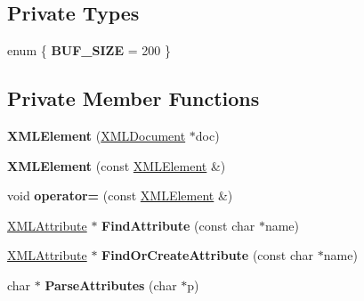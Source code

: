 \subsection*{Private Types}
\begin{DoxyCompactItemize}
\item 
enum \{ {\bfseries B\+U\+F\+\_\+\+S\+I\+ZE} = 200
 \}\hypertarget{classtinyxml2_1_1_x_m_l_element_a7b020049b954a66ca9d2ba91afe62319}{}\label{classtinyxml2_1_1_x_m_l_element_a7b020049b954a66ca9d2ba91afe62319}

\end{DoxyCompactItemize}
\subsection*{Private Member Functions}
\begin{DoxyCompactItemize}
\item 
{\bfseries X\+M\+L\+Element} (\hyperlink{classtinyxml2_1_1_x_m_l_document}{X\+M\+L\+Document} $\ast$doc)\hypertarget{classtinyxml2_1_1_x_m_l_element_a52484940e20f3734e6edc5e5c3af2dbc}{}\label{classtinyxml2_1_1_x_m_l_element_a52484940e20f3734e6edc5e5c3af2dbc}

\item 
{\bfseries X\+M\+L\+Element} (const \hyperlink{classtinyxml2_1_1_x_m_l_element}{X\+M\+L\+Element} \&)\hypertarget{classtinyxml2_1_1_x_m_l_element_a1aa8ab977a1799bf118efb158248351b}{}\label{classtinyxml2_1_1_x_m_l_element_a1aa8ab977a1799bf118efb158248351b}

\item 
void {\bfseries operator=} (const \hyperlink{classtinyxml2_1_1_x_m_l_element}{X\+M\+L\+Element} \&)\hypertarget{classtinyxml2_1_1_x_m_l_element_ae300366701a54d4b6d1c287d9b5209a7}{}\label{classtinyxml2_1_1_x_m_l_element_ae300366701a54d4b6d1c287d9b5209a7}

\item 
\hyperlink{classtinyxml2_1_1_x_m_l_attribute}{X\+M\+L\+Attribute} $\ast$ {\bfseries Find\+Attribute} (const char $\ast$name)\hypertarget{classtinyxml2_1_1_x_m_l_element_ac2415a711ab18516cd7a8eb8eea01cd6}{}\label{classtinyxml2_1_1_x_m_l_element_ac2415a711ab18516cd7a8eb8eea01cd6}

\item 
\hyperlink{classtinyxml2_1_1_x_m_l_attribute}{X\+M\+L\+Attribute} $\ast$ {\bfseries Find\+Or\+Create\+Attribute} (const char $\ast$name)\hypertarget{classtinyxml2_1_1_x_m_l_element_a4463788edbc3130f5f68eb732b9f323d}{}\label{classtinyxml2_1_1_x_m_l_element_a4463788edbc3130f5f68eb732b9f323d}

\item 
char $\ast$ {\bfseries Parse\+Attributes} (char $\ast$p)\hypertarget{classtinyxml2_1_1_x_m_l_element_a258b2b7077f6adfd1a686042a09cdd6e}{}\label{classtinyxml2_1_1_x_m_l_element_a258b2b7077f6adfd1a686042a09cdd6e}

\end{DoxyCompactItemize}
